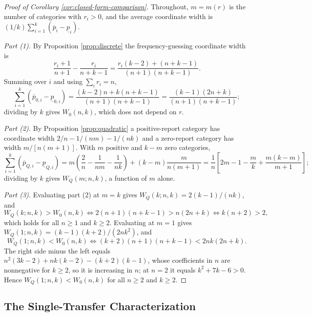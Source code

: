 \begin{proof}[Proof of Corollary \ref{cor:closed-form-comparison}]
Throughout, \(m=m(r)\) is the number of categories with \(r_i>0\), and the average coordinate width is \((1/k)\sum_{i=1}^k(\overline p_i-\underline p_i)\).

\emph{Part (1).} By Proposition \ref{prop:discrete} the frequency-guessing coordinate width is
\[
\frac{r_i+1}{n+1}-\frac{r_i}{n+k-1}
=\frac{r_i(k-2)+(n+k-1)}{(n+1)(n+k-1)}.
\]
Summing over \(i\) and using \(\sum_i r_i=n\),
\[
\sum_{i=1}^k\left(\overline p_{0,i}-\underline p_{0,i}\right)
=\frac{(k-2)n+k(n+k-1)}{(n+1)(n+k-1)}
=\frac{(k-1)(2n+k)}{(n+1)(n+k-1)};
\]
dividing by \(k\) gives \(W_0(n,k)\), which does not depend on \(r\).

\emph{Part (2).} By Proposition \ref{prop:quadratic} a positive-report category has coordinate width \(2/n-1/(nm)-1/(nk)\) and a zero-report category has width \(m/[n(m+1)]\). With \(m\) positive and \(k-m\) zero categories,
\[
\sum_{i=1}^k\left(\overline p_{Q,i}-\underline p_{Q,i}\right)
=m\left(\frac{2}{n}-\frac{1}{nm}-\frac{1}{nk}\right)+(k-m)\frac{m}{n(m+1)}
=\frac{1}{n}\left[2m-1-\frac{m}{k}+\frac{m(k-m)}{m+1}\right];
\]
dividing by \(k\) gives \(W_Q(m;n,k)\), a function of \(m\) alone.

\emph{Part (3).} Evaluating part (2) at \(m=k\) gives \(W_Q(k;n,k)=2(k-1)/(nk)\), and
\[
W_Q(k;n,k)>W_0(n,k)
\iff 2(n+1)(n+k-1)>n(2n+k)
\iff k(n+2)>2,
\]
which holds for all \(n\ge1\) and \(k\ge2\). Evaluating at \(m=1\) gives \(W_Q(1;n,k)=(k-1)(k+2)/(2nk^2)\), and
\[
W_Q(1;n,k)<W_0(n,k)
\iff (k+2)(n+1)(n+k-1)<2nk(2n+k).
\]
The right side minus the left equals \(n^2(3k-2)+nk(k-2)-(k+2)(k-1)\), whose coefficients in \(n\) are nonnegative for \(k\ge2\), so it is increasing in \(n\); at \(n=2\) it equals \(k^2+7k-6>0\). Hence \(W_Q(1;n,k)<W_0(n,k)\) for all \(n\ge2\) and \(k\ge2\).
\end{proof}

\subsection{The Single-Transfer Characterization}
\label{app:lemma-proof}


